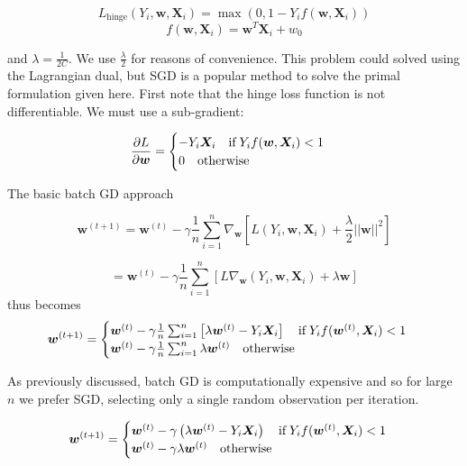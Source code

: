 \documentclass{report}
\begin{document}
$$
L_{\mathrm{hinge}}(Y_i, \bm{w}, \bm{X}_i) = \max(0, 1 - Y_i
f(\bm{w}, \bm{X}_i))
$$
$$
f(\bm{w}, \bm{X}_i) = \bm{w}^T\bm{X}_i + w_0
$$

and
$\lambda=\frac{1}{2C}$. We use $\frac{\lambda}{2}$ for reasons of
convenience. This problem could solved using the Lagrangian dual, but SGD is a
popular method to solve the primal formulation given here. First note
that the hinge loss function is not differentiable. We must use a sub-gradient:

\begin{equation}
	\frac{\partial L}{\partial \bm{w}} = 
	\begin{cases}
		-Y_i \bm{X}_i \quad \mathrm{if} \hspace{0.2em} Y_if(\bm{w}, \bm{X}_i) < 1\\
		0 \quad \mathrm{otherwise} \\
	\end{cases}
\end{equation}

The basic batch GD approach

$$
	\bm{w}^{(t+1)} = \bm{w}^{(t)} - \gamma \frac{1}{n} \sum_{i=1}^n
	\nabla_{\bm{w}} \left[ L(Y_i, \bm{w},
	\bm{X}_i) + \frac{\lambda}{2}
||\bm{w}||^2\right]
$$

$$
	= \bm{w}^{(t)} - \gamma \frac{1}{n} \sum_{i=1}^n
	 \left[ L\nabla_{\bm{w}} (Y_i, \bm{w},
	\bm{X}_i) + \lambda \bm{w} \right]
$$
thus becomes
\begin{equation}
	\bm{w}^{(t+1)} = 
	\begin{cases}
		\bm{w}^{(t)} - \gamma \frac{1}{n} \sum_{i=1}^n
		\left[
			\lambda \bm{w}^{(t)} - Y_i\bm{X}_i
		\right]
		\quad \mathrm{if} \hspace{0.2em} Y_if(\bm{w}^{(t)}, \bm{X}_i) < 1 \\

		\bm{w}^{(t)} - \gamma \frac{1}{n} \sum_{i=1}^n
		\lambda \bm{w}^{(t)} 
		\quad \textrm{otherwise} \\

	\end{cases}
\end{equation}

As previously discussed, batch GD is computationally expensive and
so for large $n$ we prefer SGD, selecting only a single random
observation per iteration.

\begin{equation}
	\bm{w}^{(t+1)} = 
	\begin{cases}
		\bm{w}^{(t)} - \gamma 
		\left(
			\lambda \bm{w}^{(t)} - Y_i\bm{X}_i
		\right)
		\quad \mathrm{if} \hspace{0.2em} Y_if(\bm{w}^{(t)}, \bm{X}_i) < 1 \\

		\bm{w}^{(t)} - \gamma 
		\lambda \bm{w}^{(t)} 
		\quad \textrm{otherwise} \\

	\end{cases}
\end{equation}
\end{document}

